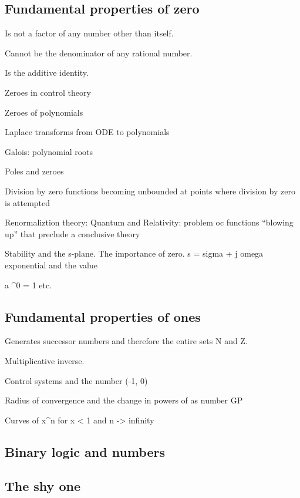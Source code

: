 \documentclass[
  a4paper,
]{article}
\begin{document}
\hypertarget{fundamental-properties-of-zero}{%
\subsection{Fundamental properties of
zero}\label{fundamental-properties-of-zero}}

Is not a factor of any number other than itself.

Cannot be the denominator of any rational number.

Is the additive identity.

Zeroes in control theory

Zeroes of polynomials

Laplace transforms from ODE to polynomials

Galois: polynomial roots

Poles and zeroes

Division by zero functions becoming unbounded at points where division
by zero is attempted

Renormaliztion theory: Quantum and Relativity: problem oc functions
``blowing up'' that preclude a conclusive theory

Stability and the s-plane. The importance of zero. s = sigma + j omega
exponential and the value

a \^{}0 = 1 etc.

\hypertarget{fundamental-properties-of-ones}{%
\subsection{Fundamental properties of
ones}\label{fundamental-properties-of-ones}}

Generates successor numbers and therefore the entire sets N and Z.

Multiplicative inverse.

Control systems and the number (-1, 0)

Radius of convergence and the change in powers of as number GP

Curves of x\^{}n for x \textless{} 1 and n -\textgreater{} infinity

\hypertarget{binary-logic-and-numbers}{%
\subsection{Binary logic and numbers}\label{binary-logic-and-numbers}}

\hypertarget{the-shy-one}{%
\subsection{The shy one}\label{the-shy-one}}
\end{document}

